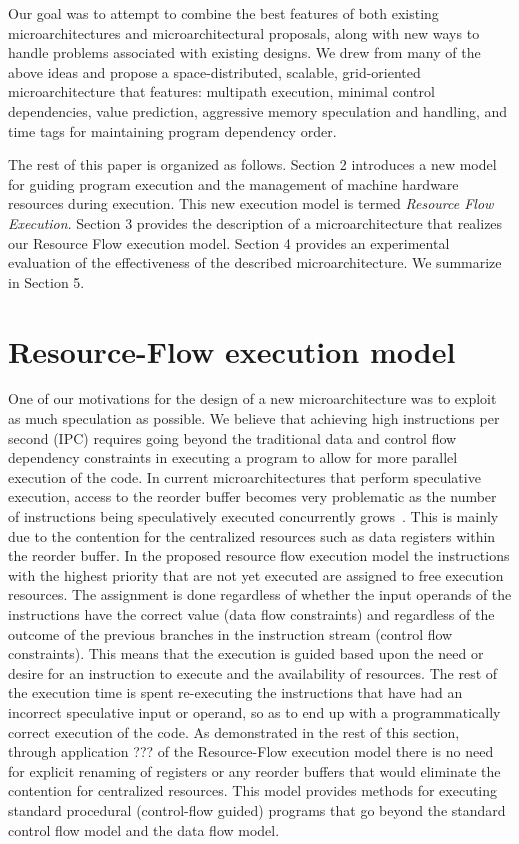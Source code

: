 \documentclass[10pt,twocolumn]{IEEEtran}
\begin{document}
Our goal was to attempt to combine the best features of
both existing microarchitectures and microarchitectural proposals,
along with new ways to handle problems associated with existing
designs.
We drew from many of the above ideas and propose a
space-distributed, scalable, grid-oriented microarchitecture
that features: multipath execution, minimal control
dependencies, value prediction, aggressive memory speculation and
handling, and time tags for maintaining program dependency order.

The rest of this paper is organized
as follows.
Section 2 introduces a new model for guiding program execution
and the management of machine hardware resources during execution.
This new execution model is termed \textit{Resource Flow Execution}.
Section 3 provides the description of a microarchitecture
that realizes our Resource Flow execution model.
Section 4 provides an experimental evaluation of the effectiveness of
the described microarchitecture.
We summarize in Section 5.
%
%
%
\section{Resource-Flow execution model}
%
One of our motivations for the design of a new microarchitecture was to
exploit as much speculation as possible.  We believe that achieving
high instructions per second (IPC)
requires going beyond the traditional data and control flow
dependency constraints in executing a program to allow for more
parallel execution of the code.  In current microarchitectures that
perform speculative execution, access to the reorder buffer becomes
very problematic as the number of instructions being speculatively
executed concurrently grows~\cite{Palacharla97}.  
This is mainly due to the
contention for the centralized resources such as data registers within
the reorder buffer.  In the proposed resource flow execution model the
instructions with the highest priority that are not yet executed are
assigned to free execution resources. 
The assignment is done regardless
of whether the input operands of the instructions have the correct
value (data flow constraints) and regardless of the outcome of the
previous branches in the instruction stream (control flow constraints).  
This means that the execution is guided
based upon the need or desire for an instruction to execute and
the availability of resources.  The rest of the execution
time is spent re-executing the instructions that have had an incorrect
speculative input or operand, so as to end up with a programmatically
correct execution of the code.  As demonstrated in the rest of this
section, through application ??? of the Resource-Flow execution model there
is no need for explicit renaming of registers or any reorder buffers
that would eliminate the contention for centralized resources.  
This model provides methods for executing standard procedural (control-flow 
guided) programs
that go beyond the standard control flow model and the 
data flow model.
\end{document}
